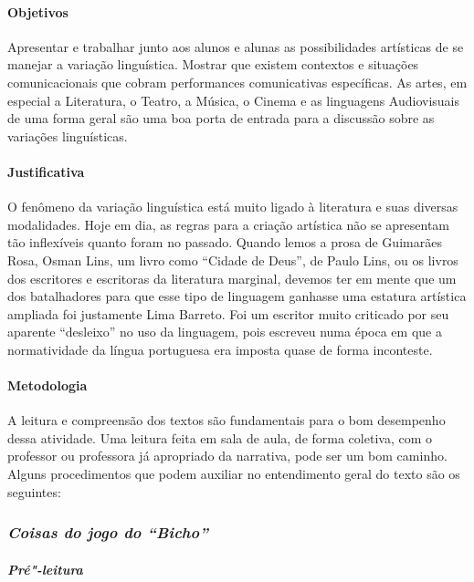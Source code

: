 \documentclass[11pt]{extarticle}
\begin{document}
\paragraph{Objetivos} Apresentar e trabalhar junto aos alunos e alunas as
possibilidades artísticas de se manejar a variação linguística. Mostrar
que existem contextos e situações comunicacionais que cobram
performances comunicativas específicas. As artes, em especial a
Literatura, o Teatro, a Música, o Cinema e as linguagens Audiovisuais de
uma forma geral são uma boa porta de entrada para a discussão sobre as
variações linguísticas.


\paragraph{Justificativa} O fenômeno da variação linguística está muito
ligado à literatura e suas diversas modalidades. Hoje em dia, as regras
para a criação artística não se apresentam tão inflexíveis quanto foram
no passado. Quando lemos a prosa de Guimarães Rosa, Osman Lins, um livro
como ``Cidade de Deus'', de Paulo Lins, ou os livros dos escritores e
escritoras da literatura marginal, devemos ter em mente que um dos
batalhadores para que esse tipo de linguagem ganhasse uma estatura
artística ampliada foi justamente Lima Barreto. Foi um escritor muito
criticado por seu aparente ``desleixo'' no uso da linguagem, pois
escreveu numa época em que a normatividade da língua portuguesa era
imposta quase de forma inconteste.

\paragraph{Metodologia} A leitura e compreensão dos textos são
fundamentais para o bom desempenho dessa atividade. Uma leitura feita em
sala de aula, de forma coletiva, com o professor ou professora já
apropriado da narrativa, pode ser um bom caminho. Alguns procedimentos
que podem auxiliar no entendimento geral do texto são os seguintes:



\subsubsection{\textit{Coisas do jogo do ``Bicho''}}

\paragraph{\textit{Pré"-leitura}}
\end{document}
